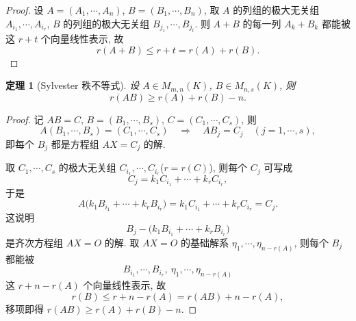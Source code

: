 \documentclass[UTF8,11pt]{ctexart}
\theoremstyle{cnthm}
\newtheorem{thm}{定理}[section]
\begin{document}
\begin{proof}
设 $A=(A_1,\cdots,A_n)$, $B=(B_1,\cdots,B_n)$, 取 $A$ 的列组的极大无关组 $A_{i_1},\cdots,A_{i_r}$, $B$ 的列组的极大无关组 $B_{j_1},\cdots,B_{j_t}$. 则 $A+B$ 的每一列 $A_k+B_k$ 都能被这 $r+t$ 个向量线性表示, 故
\[
r(A+B)\leq r+t=r(A)+r(B).
\]
\end{proof}

\begin{thm}[Sylvester 秩不等式]
设 $A\in M_{m,n}(K)$, $B\in M_{n,s}(K)$, 则
\[
r(AB)\geq r(A)+r(B)-n .
\]
\end{thm}

\begin{proof}
记 $AB=C$, $B=(B_1,\cdots,B_s)$, $C=(C_1,\cdots,C_s)$, 则
\[
A(B_1,\cdots,B_s)=(C_1,\cdots,C_s)\quad\Longrightarrow\quad AB_j=C_j\quad(j=1,\cdots,s),
\]
即每个 $B_j$ 都是方程组 $AX=C_j$ 的解.

取 $C_1,\cdots,C_s$ 的极大无关组 $C_{i_1},\cdots,C_{i_r}$($r=r(C)$), 则每个 $C_j$ 可写成
\[
C_j=k_1C_{i_1}+\cdots+k_rC_{i_r},
\]
于是
\[
A\bigl(k_1B_{i_1}+\cdots+k_rB_{i_r}\bigr)=k_1C_{i_1}+\cdots+k_rC_{i_r}=C_j .
\]
这说明
\[
B_j-\bigl(k_1B_{i_1}+\cdots+k_rB_{i_r}\bigr)
\]
是齐次方程组 $AX=O$ 的解. 取 $AX=O$ 的基础解系 $\eta_1,\cdots,\eta_{n-r(A)}$, 则每个 $B_j$ 都能被
\[
B_{i_1},\cdots,B_{i_r},\ \eta_1,\cdots,\eta_{n-r(A)}
\]
这 $r+n-r(A)$ 个向量线性表示, 故
\[
r(B)\leq r+n-r(A)=r(AB)+n-r(A),
\]
移项即得 $r(AB)\geq r(A)+r(B)-n$.
\end{proof}
\end{document}
